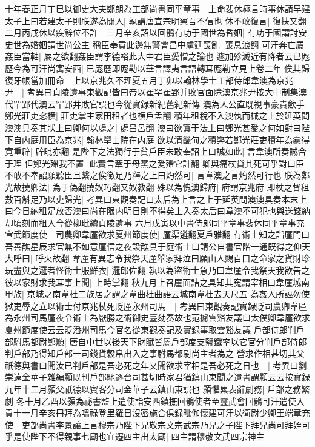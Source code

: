 十年春正月丁巳以御史大夫鄭朗為工部尚書同平章事　上命裴休極言時事休請早建太子上曰若建太子則朕遂為閒人|{
	孰謂唐宣宗明察吾不信也}
休不敢復言|{
	復扶又翻}
二月丙戌休以疾辭位不許　三月辛亥詔以回鶻有功于國世為昏姻|{
	有功于國謂討安史世為婚姻謂世尚公主}
稱臣奉貢此邊無警會昌中虜廷喪亂|{
	喪息浪翻}
可汗奔亡屬姦臣當軸|{
	屬之欲翻姦臣謂李德裕此大中君臣愛憎之論也}
遽加殄滅近有降者云已厖歷今為可汗尚寓安西|{
	已厖歷即厖勒以華言譯夷言語轉耳厖勒立見上卷二年}
俟其歸復牙帳當加冊命　上以京兆久不理夏五月丁卯以翰林學士工部侍郎韋澳為京兆尹　|{
	考異曰貞陵遺事東觀記皆曰帝以崔罕崔郢并敗官面除澳京兆尹按大中制集澳代罕郢代澳云罕郢并敗官誤也今從實録新紀舊紀新傳}
澳為人公直既視事豪貴歛手鄭光莊吏恣横|{
	莊吏掌主家田租者也横戶孟翻}
積年租稅不入澳執而械之上於延英問澳澳具奏其狀上曰卿何以處之|{
	處昌呂翻}
澳曰欲寘于法上曰鄭光甚愛之何如對曰陛下自内庭用臣為京兆|{
	翰林學士院在内庭}
欲以清畿甸之積弊若鄭光莊吏積年為蠧得寛重辟|{
	辟毗亦翻}
是陛下之法獨行于貧戶臣未敢奉詔上曰誠如此|{
	言韋澳所奏誠合于理}
但鄭光殢我不置|{
	此實言牽于母黨之愛殢它計翻}
卿與痛杖貸其死可乎對曰臣不敢不奉詔願聽臣且繋之俟徵足乃釋之上曰灼然可|{
	言韋澳之言灼然可行也}
朕為鄭光故撓卿法|{
	為于偽翻撓奴巧翻又奴教翻}
殊以為愧澳歸府|{
	府謂京兆府}
即杖之督租數百斛足乃以吏歸光|{
	考異曰東觀奏記曰太后為上言之上于延英問澳澳具奏本末上曰今日納租足放否澳曰尚在限内明日則不得矣上入奏太后曰韋澳不可犯也與送錢納却頃刻而租入今從柳玭續貞陵遺事}
六月戊寅以中書侍郎同平章事裴休同平章事充宣武節度使　司農卿韋厪欲求夏州節度使|{
	厪渠遴翻夏戶雅翻}
有術士知之詣厪門曰吾善醮星辰求官無不如意厪信之夜設醮具于庭術士曰請公自書官階一通既得之仰天大呼曰|{
	呼火故翻}
韋厪有異志令我祭天厪舉家拜泣曰願山人賜百口之命家之貨財珍玩盡與之邏者怪術士服鮮衣|{
	邏郎佐翻}
執以為盜術士急乃曰韋厪令我祭天我欲告之彼以家財求我耳事上聞|{
	上時掌翻}
秋九月上召厪面詰之具知其寃謂宰相曰韋厪城南甲族|{
	京城之南韋杜二族居之謂之韋曲杜曲語云城南韋杜去天尺五}
為姦人所誣勿使獄吏辱之立以術士付京兆杖死貶厪永州司馬　|{
	考異曰東觀奏記實録貶司農卿韋厪為永州司馬厪夜令術士為厭勝之術御史臺劾奏故也范攄雲谿友議曰太僕卿韋厪欲求夏州節度使云云貶潘州司馬今官名從東觀奏記及實録事取雲谿友議}
戶部侍郎判戶部駙馬都尉鄭顥|{
	唐自中世以後天下財賦皆屬戶部度支鹽鐵率以它官分判戶部侍郎判戶部乃得知戶部一司錢貨穀帛出入之事駙馬都尉尚主者為之}
營求作相甚切其父祇德與書曰聞汝已判戶部是吾必死之年又聞欲求宰相是吾必死之日也　|{
	考異曰劉崇遠金華子雜編顥既判戶部馳逐台司甚切時家君猶鎮山東聞之遺書謂顥云云按實録九年十二月顥父祇德以賓客分司金華子云鎮山東誤也}
顥懼累表辭劇務|{
	戶部之務繁劇}
冬十月乙酉以顥為祕書監上遣使詣安西鎮撫回鶻使者至靈武會回鶻可汗遣使入貢十一月辛亥冊拜為嗢祿登里羅日沒密施合俱録毗伽懷建可汗以衛尉少卿王端章充使　吏部尚書李景讓上言穆宗乃陛下兄敬宗文宗武宗乃兄之子陛下拜兄尚可拜姪可乎是使陛下不得親事七廟也宜遷四主出太廟|{
	四主謂穆敬文武四宗神主}
